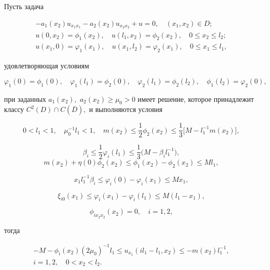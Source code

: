 \begin{lemma}[2]Пусть задача

\begin{gather*}

-a_1(x_2)u_{x_1x_1}-a_2(x_2)u_{x_2x_2}+u=0, \quad (x_1,x_2)\in D;

\\

u(0,x_2)=\phi_1(x_2), \quad u(l_1,x_2)=\phi_2(x_2), \quad 0\le x_2\le l_2;

\\

u(x_1,0)=\varphi_1(x_1), \quad u(x_1,l_2)=\varphi_2(x_1), \quad 0\le x_1\le l_1,

\end{gather*}

удовлетворяющая условиям 

$$\varphi_1(0)=\phi_1(0),\quad \varphi_1(l_1)=\phi_2(0),\quad \varphi_2(l_1)=\phi_2(l_2),\quad \phi_1(l_2)=\varphi_2(0),$$ 

при заданных $a_1(x_2),$ $a_2(x_2)\ge\mu_0>0$ имеет решение{\rm ,} которое  принадлежит классу $C^2(D)\cap C(\overline D),$ и выполняются условия 

$$0<l_1<1,\quad \mu_0^{-1}l_1<1,\quad m(x_2)\le\frac{1}{2}\phi_2(x_2)\le\frac{1}{3}\bigl[M-l_1^{-1}m(x_2)\bigr],$$ 

$$\beta_i\le\frac{1}{2}\varphi_i(l_1)\le\frac{1}{3}\bigl(M-\beta_i l_1^{-1}\bigr),$$ $$m(x_2)+\eta(0)\phi_2(x_2)\le\phi_1(x_2)-\phi_2(x_2)\le Ml_1,$$ 

$$x_1 l_1^{-1}\beta_i\le\varphi_i(0)-\varphi_i(x_1)\le Mx_1,$$ 

$$\xi_{i0}(x_1)\le\varphi_i(x_1)-\varphi_i(l_1)\le M(l_1-x_1),$$ 

$$\phi_{ix_2x_2}(x_2)=0,\quad i=1, 2,$$ 

тогда

\begin{equation}

\label{ali:24}

\begin{array}{c}

-M-\phi_i(x_2)(2\mu_0)^{-1}l_1\le u_{x_1}(il_1-l_1,x_2)\le-m(x_2)l_1^{-1}, \\ i=1, 2, \quad  0<x_2<l_2.

\end{array}

\end{equation}

\end{lemma}





